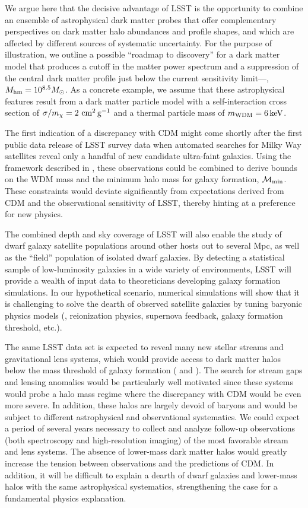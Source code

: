 We argue here that the decisive advantage of LSST is the opportunity to combine an ensemble of astrophysical dark matter probes that offer complementary perspectives on dark matter halo abundances and profile shapes, and which are affected by different sources of systematic uncertainty.
For the purpose of illustration, we outline a possible ``roadmap to discovery'' for a dark matter model that produces a cutoff in the matter power spectrum and a suppression of the central dark matter profile just below the current sensitivity limit---\ie, $M_{\rm hm} = 10^{8.5}M_\odot$.
As a concrete example, we assume that these astrophysical features result from a dark matter particle model with a self-interaction cross section of $\sigma/m_\chi = 2 \mathrm{\,\mathrm{\,cm}^2\mathrm{\,g}^{-1}}$ and a thermal particle mass of $m_{\rm WDM} = 6 \mathrm{\,keV}$.

The first indication of a discrepancy with CDM might come shortly after the first public data release of LSST survey data when automated searches for Milky Way satellites reveal only a handful of new candidate ultra-faint galaxies. 
Using the framework described in , these observations could be combined to derive bounds on the WDM mass and the minimum halo mass for galaxy formation, $\mathcal{M}_{\rm min}$. These constraints would deviate significantly from expectations derived from CDM and the observational sensitivity of LSST, thereby hinting at a preference for new physics.

The combined depth and sky coverage of LSST will also enable the study of dwarf galaxy satellite populations around other hosts out to several Mpc, as well as the ``field'' population of isolated dwarf galaxies.
By detecting a statistical sample of low-luminosity galaxies in a wide variety of environments, LSST will provide a wealth of input data to theoreticians developing galaxy formation simulations.
In our hypothetical scenario, numerical simulations will show that it is challenging to solve the dearth of observed satellite galaxies by tuning baryonic physics models (\eg, reionization physics, supernova feedback, galaxy formation threshold, etc.).

The same LSST data set is expected to reveal many new stellar streams and gravitational lens systems, which would provide access to dark matter halos below the mass threshold of galaxy formation ( and ).
The search for stream gaps and lensing anomalies would be particularly well motivated since these systems would probe a halo mass regime where the discrepancy with CDM would be even more severe.
In addition, these halos are largely devoid of baryons and would be subject to different astrophysical and observational systematics.
We could expect a period of several years necessary to collect and analyze follow-up observations (both spectroscopy and high-resolution imaging) of the most favorable stream and lens systems.
The absence of lower-mass dark matter halos would greatly increase the tension between observations and the predictions of CDM.
In addition, it will be difficult to explain a dearth of dwarf galaxies and lower-mass halos with the same astrophysical systematics, strengthening the case for a fundamental physics explanation.

